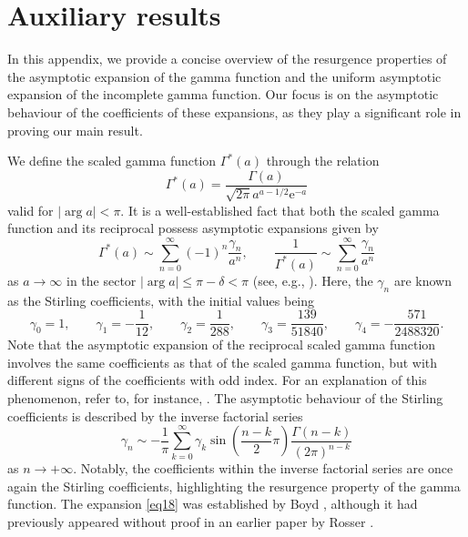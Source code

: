 \documentclass[pdftex]{sigma}
\def\e{\mathrm{e}}
\numberwithin{equation}{section}
\begin{document}
\appendix

\section{Auxiliary results}\label{appendixa}

In this appendix, we provide a concise overview of the resurgence properties of the asymptotic expansion of the gamma function and the uniform asymptotic expansion of the incomplete gamma function. Our focus is on the asymptotic behaviour of the coefficients of these expansions, as they play a significant role in proving our main result.

We define the scaled gamma function $\Gamma^\ast(a)$ through the relation
\begin{equation}\label{eq24}
\Gamma^\ast (a) = \frac{\Gamma (a)}{\sqrt {2\pi } a^{a - 1/2} \e^{ - a} }
\end{equation}
valid for $|\arg a|<\pi$. It is a well-established fact that both the scaled gamma function and its reciprocal possess asymptotic expansions given by
\begin{equation}\label{eq25}
\Gamma^\ast (a) \sim \sum_{n = 0}^\infty ( - 1)^n \frac{\gamma _n }{a^n } ,\qquad \frac{1}{\Gamma^\ast (a)} \sim \sum_{n = 0}^\infty \frac{\gamma _n }{a^n }
\end{equation}
as $a\to \infty$ in the sector $|\arg a| \le \pi-\delta<\pi$ (see, e.g., \cite[Section~3.6]{Temme1996}). Here, the $\gamma_n$ are known as the Stirling coefficients, with the initial values being
\[
\gamma _0 = 1,\qquad\gamma _1 = - \frac{1}{12},\qquad\gamma _2 = \frac{1}{288},\qquad\gamma _3 = \frac{139}{51840},\qquad\gamma _4 = - \frac{571}{2488320}.
\]
Note that the asymptotic expansion of the reciprocal scaled gamma function involves the same coefficients as that of the scaled gamma function, but with different signs of the coefficients with odd index. For an explanation of this phenomenon, refer to, for instance, \cite[p.~63]{Temme1996}. The asymptotic behaviour of the Stirling coefficients is described by the inverse factorial series
\begin{equation}\label{eq18}
\gamma _n \sim -\frac{1}{\pi}\sum_{k= 0}^{\infty} \gamma_k \sin\left( \frac{n -k}{2}\pi \right)\frac{\Gamma (n - k)}{(2\pi )^{n - k}}
\end{equation}
as $n\to+\infty$. Notably, the coefficients within the inverse factorial series are once again the Stirling coefficients, highlighting the resurgence property of the gamma function. The expansion \eqref{eq18} was established by Boyd \cite[equation~(3.34)]{Boyd1994}, although it had previously appeared without proof in an earlier paper by Rosser \cite[equation~(97)]{Rosser1955}.
\end{document}
